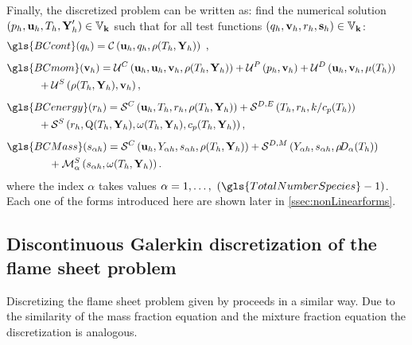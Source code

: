 Finally, the discretized problem can be written as: find the numerical solution $(p_h,\textbf{u}_h, T_h, \textbf{Y}'_h) \in \mathbb{V}_{\textbf{k}}$ such that for all test functions $(q_h,\textbf{v}_h, r_h, \mathbf{s}_h) \in \mathbb{V}_{\textbf{k}}$:
\begin{subequations}
	\begin{flalign}%
		&\gls{BCcont}(q_h)= \ContDis\ ,& \label{DiscretizedConti}\\[1ex]
		&\gls{BCmom}(\vec{v}_h) =	\MomConv + \MomPres + \MomDiff & \notag\\
		& \quad\quad\quad + \MomSource,& \label{DiscretizedMomentum}\\[1ex]
		&\gls{BCenergy}(r_h)
		 = \mathcal{S}^C\left(\vec{u}_h,T_h,r_h, \rhoh\right) + \mathcal{S}^{D,E}\left(T_h,r_h,k/c_p(T_h)\right)&  \notag\\
		& \quad\quad\quad + \mathcal{S}^S\left(r_h, \heatRelease(T_h,\vec{Y}_h), \rateReac(T_h,\vec{Y}_h),\cph\right),& \label{DiscretizedEnergy}   \\[1ex]
		&\gls{BCMass}(s_{\alpha h})= \mathcal{S}^C\left(\vec{u}_h,\Yi, s_{\alpha h}, \rhoh\right) + \mathcal{S}^{D,M}\left(\Yi,s_{\alpha h},\rhodh\right)&  \notag \\
		& \quad\quad\quad\quad + \mathcal{M}^S_\alpha\left(s_{\alpha h},\rateReac(T_h,\vec{Y}_h )\right).& \label{DiscretizedMassFractions}
	\end{flalign}\label{eqs:variatProblemFull}
\end{subequations}
where the index $\alpha$ takes values $\alpha = 1, \dots,~(\gls{TotalNumberSpecies} - 1)$. Each one of the forms introduced here are shown later in \cref{ssec:nonLinearforms}.
\subsection{Discontinuous Galerkin discretization of the flame sheet problem}
Discretizing the flame sheet problem given by  proceeds in a similar way. Due to the similarity of the mass fraction equation and the mixture fraction equation the discretization is analogous.

